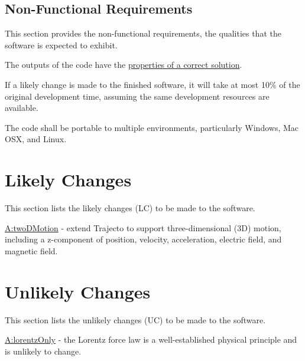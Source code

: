 \documentclass[12pt]{article}
\begin{document}
\subsection{Non-Functional Requirements}
\label{Sec:NFRs}
This section provides the non-functional requirements, the qualities that the software is expected to exhibit.

\begin{description}[font=\normalfont]
\item[Correctness:\phantomsection\label{correct}]{The outputs of the code have the \hyperref[Sec:CorSolProps]{properties of a correct solution}.}
\item[Maintainability:\phantomsection\label{maintainable}]{If a likely change is made to the finished software, it will take at most 10$\%$ of the original development time, assuming the same development resources are available.}
\item[Portability:\phantomsection\label{portable}]{The code shall be portable to multiple environments, particularly Windows, Mac OSX, and Linux.}
\end{description}
\section{Likely Changes}
\label{Sec:LCs}
This section lists the likely changes (LC) to be made to the software.

\begin{description}[font=\normalfont]
\item[lcExtendTo3D:\phantomsection\label{lcExtendTo3D}]{\hyperref[twoDMotion]{A:twoDMotion} - extend Trajecto to support three-dimensional (3D) motion, including a z-component of position, velocity, acceleration, electric field, and magnetic field.}
\end{description}
\section{Unlikely Changes}
\label{Sec:UCs}
This section lists the unlikely changes (UC) to be made to the software.

\begin{description}[font=\normalfont]
\item[ucLorentzForce:\phantomsection\label{ucLorentzForce}]{\hyperref[lorentzOnly]{A:lorentzOnly} - the Lorentz force law is a well-established physical principle and is unlikely to change.}
\end{description}
\end{document}
